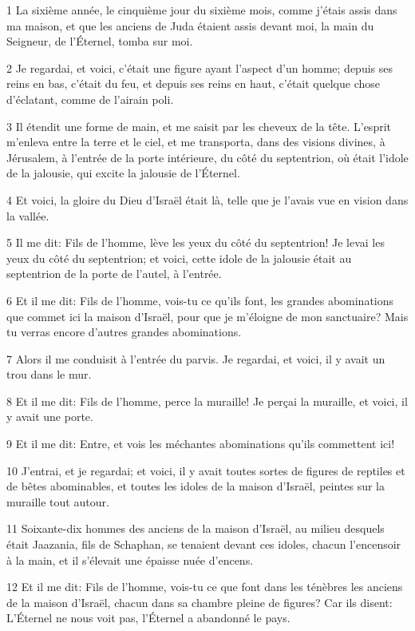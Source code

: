 \par 1 La sixième année, le cinquième jour du sixième mois, comme j'étais assis dans ma maison, et que les anciens de Juda étaient assis devant moi, la main du Seigneur, de l'Éternel, tomba sur moi.
\par 2 Je regardai, et voici, c'était une figure ayant l'aspect d'un homme; depuis ses reins en bas, c'était du feu, et depuis ses reins en haut, c'était quelque chose d'éclatant, comme de l'airain poli.
\par 3 Il étendit une forme de main, et me saisit par les cheveux de la tête. L'esprit m'enleva entre la terre et le ciel, et me transporta, dans des visions divines, à Jérusalem, à l'entrée de la porte intérieure, du côté du septentrion, où était l'idole de la jalousie, qui excite la jalousie de l'Éternel.
\par 4 Et voici, la gloire du Dieu d'Israël était là, telle que je l'avais vue en vision dans la vallée.
\par 5 Il me dit: Fils de l'homme, lève les yeux du côté du septentrion! Je levai les yeux du côté du septentrion; et voici, cette idole de la jalousie était au septentrion de la porte de l'autel, à l'entrée.
\par 6 Et il me dit: Fils de l'homme, vois-tu ce qu'ils font, les grandes abominations que commet ici la maison d'Israël, pour que je m'éloigne de mon sanctuaire? Mais tu verras encore d'autres grandes abominations.
\par 7 Alors il me conduisit à l'entrée du parvis. Je regardai, et voici, il y avait un trou dans le mur.
\par 8 Et il me dit: Fils de l'homme, perce la muraille! Je perçai la muraille, et voici, il y avait une porte.
\par 9 Et il me dit: Entre, et vois les méchantes abominations qu'ils commettent ici!
\par 10 J'entrai, et je regardai; et voici, il y avait toutes sortes de figures de reptiles et de bêtes abominables, et toutes les idoles de la maison d'Israël, peintes sur la muraille tout autour.
\par 11 Soixante-dix hommes des anciens de la maison d'Israël, au milieu desquels était Jaazania, fils de Schaphan, se tenaient devant ces idoles, chacun l'encensoir à la main, et il s'élevait une épaisse nuée d'encens.
\par 12 Et il me dit: Fils de l'homme, vois-tu ce que font dans les ténèbres les anciens de la maison d'Israël, chacun dans sa chambre pleine de figures? Car ils disent: L'Éternel ne nous voit pas, l'Éternel a abandonné le pays.
